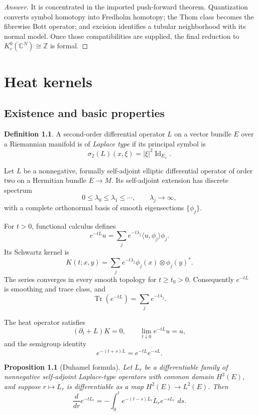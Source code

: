 \documentclass[11pt,oneside,reqno]{book}
\DeclareMathOperator{\Tr}{Tr}
\newcommand{\C}{\mathbb C}
\newcommand{\dd}{\,d}
\theoremstyle{plain}
\newtheorem{proposition}[theorem]{Proposition}
\theoremstyle{definition}
\newtheorem{definition}[theorem]{Definition}
\theoremstyle{remark}
\newenvironment{answer}{\begin{proof}[Answer]}{\end{proof}}
\begin{document}
\begin{answer}
It is concentrated in the imported push-forward theorem. Quantization converts
symbol homotopy into Fredholm homotopy; the Thom class becomes the
fibrewise Bott operator; and excision identifies a tubular neighborhood
with its normal model. Once those compatibilities are supplied, the final
reduction to \(K_c^0(\C^N)\cong\mathbb Z\) is formal.
\end{answer}


\chapter{Heat kernels}

\section{Existence and basic properties}

\begin{definition}\label{def:laplace-type}
A second-order differential operator \(L\) on a vector bundle \(E\) over a
Riemannian manifold is of \emph{Laplace type} if its principal symbol is
\[
 \sigma_2(L)(x,\xi)=|\xi|^2\operatorname{Id}_{E_x}.
\]
\end{definition}

Let \(L\) be a nonnegative, formally self-adjoint elliptic differential
operator of order two on a Hermitian bundle \(E\to M\). Its self-adjoint
extension has discrete spectrum
\[
 0\leq\lambda_0\leq\lambda_1\leq\cdots,\qquad
 \lambda_j\longrightarrow\infty,
\]
with a complete orthonormal basis of smooth eigensections
\(\{\phi_j\}\).

For \(t>0\), functional calculus defines
\[
 e^{-tL}u=\sum_je^{-t\lambda_j}\langle u,\phi_j\rangle\phi_j.
\]
Its Schwartz kernel is
\[
 K(t;x,y)=\sum_je^{-t\lambda_j}\phi_j(x)\otimes\phi_j(y)^*.
\]
The series converges in every smooth topology for \(t\geq t_0>0\).
Consequently \(e^{-tL}\) is smoothing and trace class, and
\[
 \Tr(e^{-tL})=\sum_je^{-t\lambda_j}.
\]

The heat operator satisfies
\[
 (\partial_t+L)K=0,\qquad
 \lim_{t\downarrow0}e^{-tL}u=u,
\]
and the semigroup identity
\[
 e^{-(t+s)L}=e^{-tL}e^{-sL}.
\]

\begin{proposition}[Duhamel formula]
Let \(L_r\) be a differentiable family of nonnegative self-adjoint
Laplace-type operators with common domain \(H^2(E)\), and suppose
\(r\mapsto L_r\) is differentiable as a map
\(H^2(E)\to L^2(E)\). Then
\[
 \frac{d}{dr}e^{-tL_r}
 =
 -\int_0^t
 e^{-(t-s)L_r}\dot L_r e^{-sL_r}\,\dd s.
\]
\end{proposition}
\end{document}
